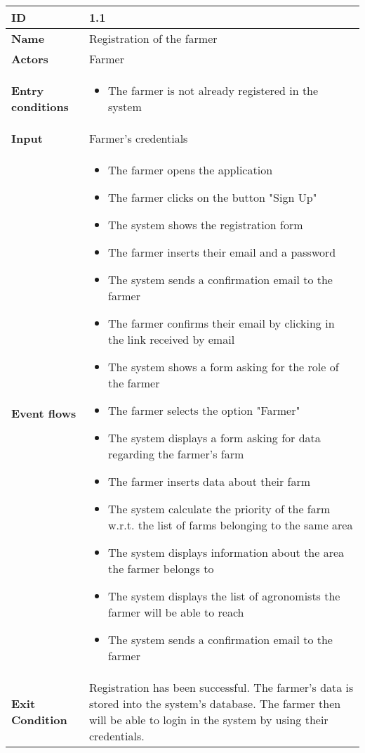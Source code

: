 \begin{longtable}[H]{ | l | p{10cm} | }
\hline
{\cellcolor[rgb]{0.753,0.753,0.753}}\textbf{ID}  & 1.1 \\ \hline
{\cellcolor[rgb]{0.753,0.753,0.753}}\textbf{Name} & Registration of the farmer \\ \hline
{\cellcolor[rgb]{0.753,0.753,0.753}}\textbf{Actors} & Farmer \\ \hline
{\cellcolor[rgb]{0.753,0.753,0.753}}\textbf{Entry conditions} &
\begin{itemize}
    \item The farmer is not already registered in the system
\end{itemize}
\\ \hline
{\cellcolor[rgb]{0.753,0.753,0.753}}\textbf{Input} & Farmer's credentials\\ \hline
{\cellcolor[rgb]{0.753,0.753,0.753}}\textbf{Event flows} &
\begin{itemize}
    \item The farmer opens the application
    \item The farmer clicks on the button "Sign Up"
    \item The system shows the registration form
    \item The farmer inserts their email and a password
    \item The system sends a confirmation email to the farmer
    \item The farmer confirms their email by clicking in the link received by email
    \item The system shows a form asking for the role of the farmer
    \item The farmer selects the option "Farmer"
    \item The system displays a form asking for data regarding the farmer's farm
    \item The farmer inserts data about their farm
    \item The system calculate the priority of the farm w.r.t. the list of farms belonging to the same area
    \item The system displays information about the area the farmer belongs to
    \item The system displays the list of agronomists the farmer will be able to reach
    \item The system sends a confirmation email to the farmer
\end{itemize}
\\ \hline
{\cellcolor[rgb]{0.753,0.753,0.753}}\textbf{Exit Condition} & Registration has been successful. The farmer's data is stored into the system's database. The farmer then will be able to login in the system by using their credentials.\\ \hline

\end{longtable}
